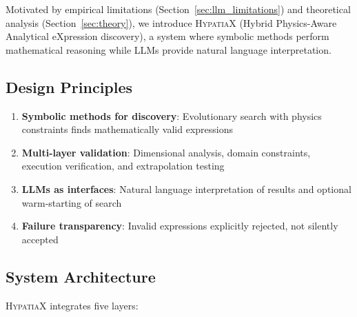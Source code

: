 \documentclass[twoside,11pt]{article}
\begin{document}
Motivated by empirical limitations (Section~\ref{sec:llm_limitations}) and theoretical analysis (Section~\ref{sec:theory}), we introduce \textsc{HypatiaX} (Hybrid Physics-Aware Analytical eXpression discovery), a system where symbolic methods perform mathematical reasoning while LLMs provide natural language interpretation\citep{koza1994genetic}\citep{lewkowycz2022minerva}\citep{kambhampati2024llms}.

\subsection{Design Principles}

\begin{enumerate}
\item \textbf{Symbolic methods for discovery}: Evolutionary search with physics constraints finds mathematically valid expressions\citep{koza1994genetic}
\item \textbf{Multi-layer validation}: Dimensional analysis, domain constraints, execution verification, and extrapolation testing
\item \textbf{LLMs as interfaces}: Natural language interpretation of results and optional warm-starting of search\citep{kambhampati2024llms}
\item \textbf{Failure transparency}: Invalid expressions explicitly rejected, not silently accepted
\end{enumerate}

\subsection{System Architecture}

\textsc{HypatiaX} integrates five layers:
\end{document}
